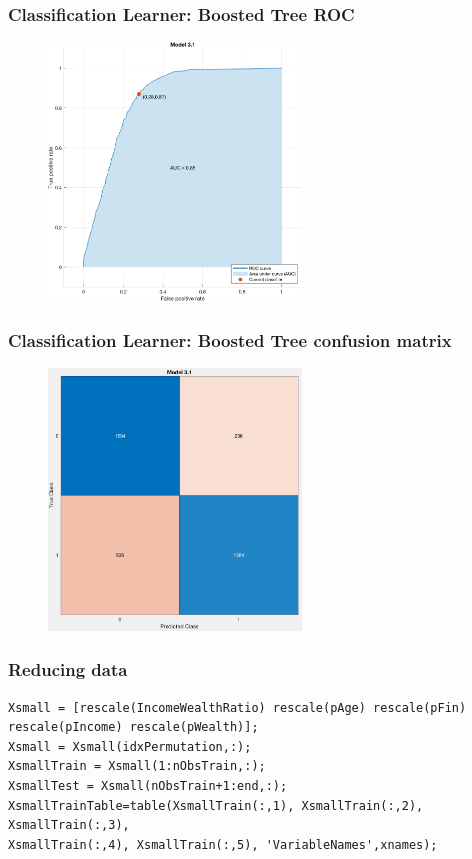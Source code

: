\documentclass{beamer}
\begin{document}
\begin{frame}
    \frametitle{Classification Learner: Boosted Tree ROC}
    \begin{figure}
    	\centering
    	\includegraphics[width=0.6\textwidth]{cl_1_roc}
    \end{figure}
\end{frame}

\begin{frame}
    \frametitle{Classification Learner: Boosted Tree confusion matrix}
    \begin{figure}
    	\centering
    	\includegraphics[width=0.6\textwidth]{cl_1_confusion}
    \end{figure}
\end{frame}

\begin{frame}[fragile]
\frametitle{Reducing data}
\tiny
\begin{verbatim}
Xsmall = [rescale(IncomeWealthRatio) rescale(pAge) rescale(pFin) rescale(pIncome) rescale(pWealth)];
Xsmall = Xsmall(idxPermutation,:);
XsmallTrain = Xsmall(1:nObsTrain,:);
XsmallTest = Xsmall(nObsTrain+1:end,:);
XsmallTrainTable=table(XsmallTrain(:,1), XsmallTrain(:,2), XsmallTrain(:,3),
XsmallTrain(:,4), XsmallTrain(:,5), 'VariableNames',xnames);
\end{verbatim}
\end{frame}
\end{document}
